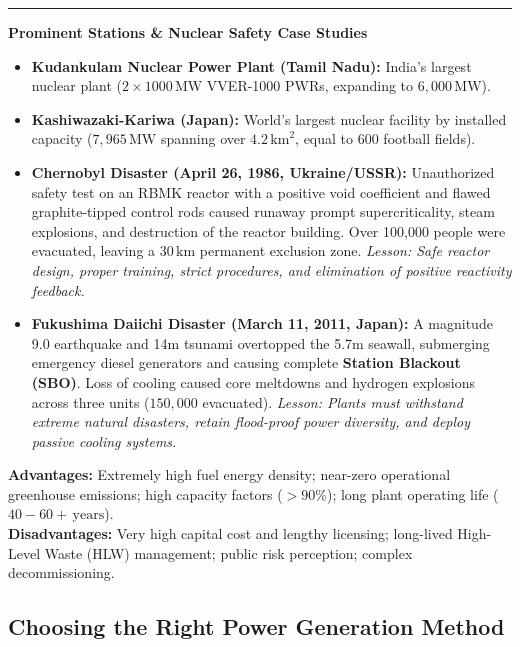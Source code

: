 \documentclass[11pt,a4paper]{article}
\newcommand{\concept}[1]{%
  \vspace{3pt}\noindent\textcolor{AnthGreen}{\rule{3.5pt}{10pt}}\enspace
  \textbf{\sffamily\color{AnthDark}#1}\par\vspace{2pt}%
}
\newenvironment{Note}[1][Note]{\begin{tcolorbox}[notebox, title=#1]}{\end{tcolorbox}}
\begin{document}
\concept{Prominent Stations \& Nuclear Safety Case Studies}
\begin{itemize}
  \item \textbf{Kudankulam Nuclear Power Plant (Tamil Nadu):} India's largest nuclear plant ($2 \times 1000\,\text{MW}$ VVER-1000 PWRs, expanding to $6,000\,\text{MW}$).
  \item \textbf{Kashiwazaki-Kariwa (Japan):} World's largest nuclear facility by installed capacity ($7,965\,\text{MW}$ spanning over $4.2\,\text{km}^2$, equal to 600 football fields).
  \item \textbf{Chernobyl Disaster (April 26, 1986, Ukraine/USSR):} Unauthorized safety test on an RBMK reactor with a positive void coefficient and flawed graphite-tipped control rods caused runaway prompt supercriticality, steam explosions, and destruction of the reactor building. Over 100,000 people were evacuated, leaving a $30\,\text{km}$ permanent exclusion zone. \emph{Lesson: Safe reactor design, proper training, strict procedures, and elimination of positive reactivity feedback.}
  \item \textbf{Fukushima Daiichi Disaster (March 11, 2011, Japan):} A magnitude 9.0 earthquake and 14m tsunami overtopped the 5.7m seawall, submerging emergency diesel generators and causing complete \textbf{Station Blackout (SBO)}. Loss of cooling caused core meltdowns and hydrogen explosions across three units ($150,000$ evacuated). \emph{Lesson: Plants must withstand extreme natural disasters, retain flood-proof power diversity, and deploy passive cooling systems.}
\end{itemize}

\begin{Note}[Advantages \& Disadvantages of Nuclear Power]
\textbf{Advantages:} Extremely high fuel energy density; near-zero operational greenhouse emissions; high capacity factors ($>90\%$); long plant operating life ($40-60+\,\text{years}$).\\
\textbf{Disadvantages:} Very high capital cost and lengthy licensing; long-lived High-Level Waste (HLW) management; public risk perception; complex decommissioning.
\end{Note}

\subsection{Choosing the Right Power Generation Method}
\end{document}
